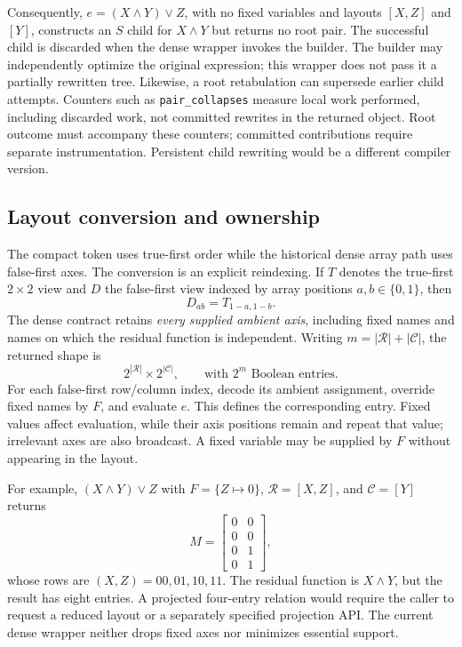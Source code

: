 \documentclass[10pt]{article}
\theoremstyle{plain}
\theoremstyle{definition}
\theoremstyle{remark}
\begin{document}
Consequently, $e=(X\land Y)\lor Z$, with no fixed variables and layouts $[X,Z]$ and $[Y]$, constructs an $S$ child for $X\land Y$ but returns no root pair. The successful child is discarded when the dense wrapper invokes the builder. The builder may independently optimize the original expression; this wrapper does not pass it a partially rewritten tree. Likewise, a root retabulation can supersede earlier child attempts. Counters such as \texttt{pair\_collapses} measure local work performed, including discarded work, not committed rewrites in the returned object. Root outcome must accompany these counters; committed contributions require separate instrumentation. Persistent child rewriting would be a different compiler version.

\subsection{Layout conversion and ownership}

The compact token uses true-first order while the historical dense array path uses false-first axes. The conversion is an explicit reindexing. If $T$ denotes the true-first $2\times2$ view and $D$ the false-first view indexed by array positions $a,b\in\{0,1\}$, then
\begin{equation}
 D_{ab}=T_{1-a,1-b}.
 \label{eq:layout-conversion}
\end{equation}
The dense contract retains \emph{every supplied ambient axis}, including fixed names and names on which the residual function is independent. Writing $m=|\mathcal R|+|\mathcal C|$, the returned shape is
\begin{equation}
 2^{|\mathcal R|}\times2^{|\mathcal C|},\qquad\text{with }2^m\text{ Boolean entries}.
 \label{eq:ambient-shape}
\end{equation}
For each false-first row/column index, decode its ambient assignment, override fixed names by $F$, and evaluate $e$. This defines the corresponding entry. Fixed values affect evaluation, while their axis positions remain and repeat that value; irrelevant axes are also broadcast. A fixed variable may be supplied by $F$ without appearing in the layout.

For example, $(X\land Y)\lor Z$ with $F=\{Z\mapsto0\}$, $\mathcal R=[X,Z]$, and $\mathcal C=[Y]$ returns
\begin{equation}
 M=\begin{bmatrix}0&0\\0&0\\0&1\\0&1\end{bmatrix},
 \label{eq:fixed-axis-example}
\end{equation}
whose rows are $(X,Z)=00,01,10,11$. The residual function is $X\land Y$, but the result has eight entries. A projected four-entry relation would require the caller to request a reduced layout or a separately specified projection API. The current dense wrapper neither drops fixed axes nor minimizes essential support.
\end{document}
